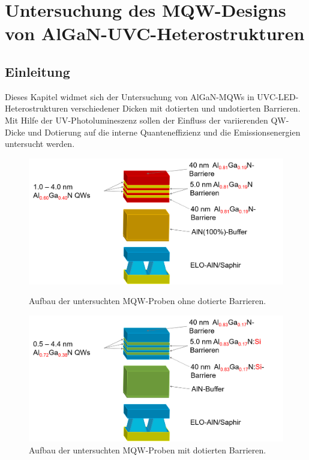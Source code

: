 \thispagestyle{fancy}
\justifying
\chapter{Untersuchung des MQW-Designs von AlGaN-UVC-Heterostrukturen}
\label{chap:mqw}
\section{Einleitung}
Dieses Kapitel widmet sich der Untersuchung von AlGaN-MQWs in UVC-LED-Heterostrukturen verschiedener Dicken mit dotierten und undotierten Barrieren. Mit Hilfe der UV-Photolumineszenz sollen der Einfluss der variierenden QW-Dicke und Dotierung auf die interne Quanteneffizienz und die Emissionsenergien untersucht werden. 
\begin{figure}[H]
  \centering
  \begin{minipage}[t]{0.45\textwidth}
    \centering
    \includegraphics[width=\textwidth]{Bilder/MQWdickenSerie/undotiert}
		\caption{Aufbau der untersuchten MQW-Proben ohne dotierte Barrieren.}
    \label{fig:undotiert}
  \end{minipage}
	\hfill
  \begin{minipage}[t]{0.45\textwidth}
    \centering
    \includegraphics[width=\linewidth]{Bilder/MQWdickenSerie/dotiert}
		\caption{Aufbau der untersuchten MQW-Proben mit dotierten Barrieren.}
    \label{fig:dotiert}
  \end{minipage}
\end{figure}
